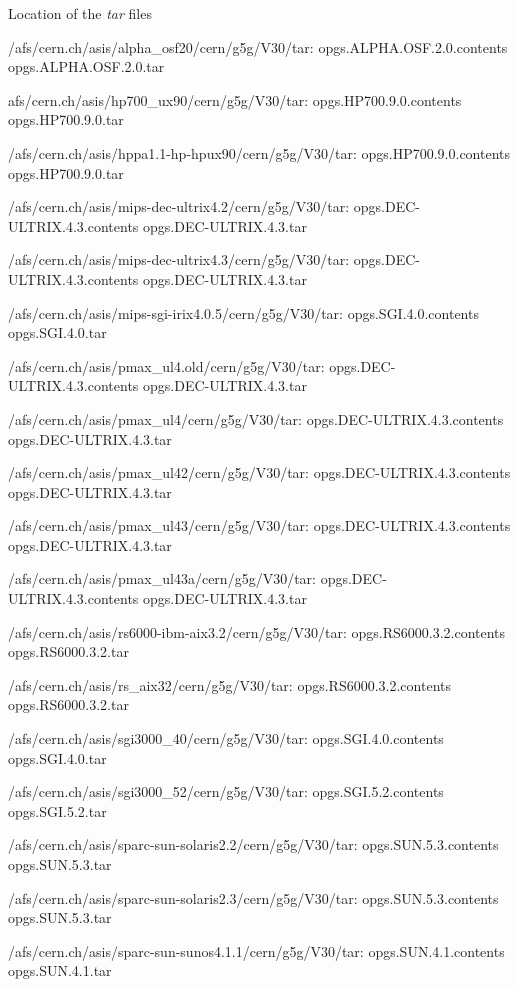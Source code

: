 \begin{XMPt}{Location of the {\it tar} files}

/afs/cern.ch/asis/alpha_osf20/cern/g5g/V30/tar:
opgs.ALPHA.OSF.2.0.contents
opgs.ALPHA.OSF.2.0.tar

 afs/cern.ch/asis/hp700_ux90/cern/g5g/V30/tar:
opgs.HP700.9.0.contents
opgs.HP700.9.0.tar

/afs/cern.ch/asis/hppa1.1-hp-hpux90/cern/g5g/V30/tar:
opgs.HP700.9.0.contents
opgs.HP700.9.0.tar

/afs/cern.ch/asis/mips-dec-ultrix4.2/cern/g5g/V30/tar:
opgs.DEC-ULTRIX.4.3.contents
opgs.DEC-ULTRIX.4.3.tar

/afs/cern.ch/asis/mips-dec-ultrix4.3/cern/g5g/V30/tar:
opgs.DEC-ULTRIX.4.3.contents
opgs.DEC-ULTRIX.4.3.tar

/afs/cern.ch/asis/mips-sgi-irix4.0.5/cern/g5g/V30/tar:
opgs.SGI.4.0.contents
opgs.SGI.4.0.tar

/afs/cern.ch/asis/pmax_ul4.old/cern/g5g/V30/tar:
opgs.DEC-ULTRIX.4.3.contents
opgs.DEC-ULTRIX.4.3.tar

/afs/cern.ch/asis/pmax_ul4/cern/g5g/V30/tar:
opgs.DEC-ULTRIX.4.3.contents
opgs.DEC-ULTRIX.4.3.tar

/afs/cern.ch/asis/pmax_ul42/cern/g5g/V30/tar:
opgs.DEC-ULTRIX.4.3.contents
opgs.DEC-ULTRIX.4.3.tar

/afs/cern.ch/asis/pmax_ul43/cern/g5g/V30/tar:
opgs.DEC-ULTRIX.4.3.contents
opgs.DEC-ULTRIX.4.3.tar

/afs/cern.ch/asis/pmax_ul43a/cern/g5g/V30/tar:
opgs.DEC-ULTRIX.4.3.contents
opgs.DEC-ULTRIX.4.3.tar

/afs/cern.ch/asis/rs6000-ibm-aix3.2/cern/g5g/V30/tar:
opgs.RS6000.3.2.contents
opgs.RS6000.3.2.tar

/afs/cern.ch/asis/rs_aix32/cern/g5g/V30/tar:
opgs.RS6000.3.2.contents
opgs.RS6000.3.2.tar

/afs/cern.ch/asis/sgi3000_40/cern/g5g/V30/tar:
opgs.SGI.4.0.contents
opgs.SGI.4.0.tar

/afs/cern.ch/asis/sgi3000_52/cern/g5g/V30/tar:
opgs.SGI.5.2.contents
opgs.SGI.5.2.tar

/afs/cern.ch/asis/sparc-sun-solaris2.2/cern/g5g/V30/tar:
opgs.SUN.5.3.contents
opgs.SUN.5.3.tar

/afs/cern.ch/asis/sparc-sun-solaris2.3/cern/g5g/V30/tar:
opgs.SUN.5.3.contents
opgs.SUN.5.3.tar

/afs/cern.ch/asis/sparc-sun-sunos4.1.1/cern/g5g/V30/tar:
opgs.SUN.4.1.contents
opgs.SUN.4.1.tar


\end{XMPt}
